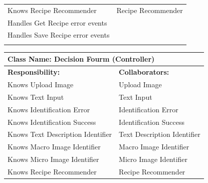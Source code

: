 \documentclass[]{article}
\begin{document}
\begin{itemize}
\begin{table}[ht]
\begin{tabular}{|p{6cm}|p{6cm}|}
		\hline
		Knows Recipe Recommender & Recipe Recommender \\
		Handles Get Recipe error events & \\
		Handles Save Recipe error events & \\
		\vspace{1in} & \\
		\hline
		\end{tabular}
	\end{table}
	\begin{table}[ht]
		\centering
		\begin{tabular}{|p{6cm}|p{6cm}|}
		\hline 
		\multicolumn{2}{|l|}{\textbf{Class Name: Decision Fourm (Controller)}} \\
		\hline
		\textbf{Responsibility:} & \textbf{Collaborators:} \\
		\hline
		Knows Upload Image & Upload Image \\
		Knows Text Input & Text Input \\
		Knows Identification Error & Identification Error \\
		Knows Identification Success & Identification Success \\
		Knows Text Description Identifier &  Text Description Identifier \\
		Knows Macro Image Identifier & Macro Image Identifier \\
		Knows Micro Image Identifier & Micro Image Identifier \\
		Knows Recipe Recommender & Recipe Recommender \\


\end{tabular}
\end{table}
\end{itemize}
\end{document}
